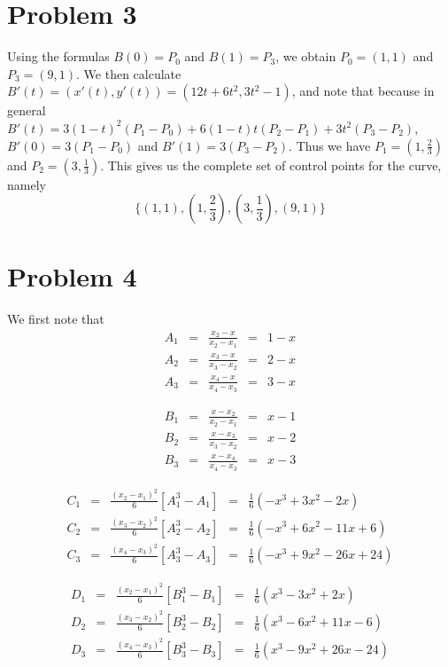 \documentclass[11pt]{article} %
\begin{document}
\section*{Problem 3}
Using the formulas $B(0) = P_0$ and $B(1) = P_3$, we obtain $P_0 = (1,1)$ and $P_3 = (9,1)$. We then calculate $B'(t) = (x'(t),y'(t)) = (12t+6t^2,3t^2 - 1)$, and note that because in general $B'(t) = 3(1-t)^2(P_1 - P_0) + 6(1-t)t(P_2-P_1) + 3t^2(P_3 - P_2)$, $B'(0) = 3(P_1 - P_0)$ and $B'(1) = 3(P_3 - P_2)$. Thus we have $P_1 = (1,\frac{2}{3})$ and $P_2 = (3,\frac{1}{3})$. This gives us the complete set of control points for the curve, namely
$$\{(1,1),  (1,\frac{2}{3}),   (3,\frac{1}{3}), (9,1) \}$$
\section*{Problem 4}

We first note that 
$$\begin{array}{lclcl} A_1 & = &  \frac{x_2 - x}{x_2 - x_1} & = & 1-x \\
		        A_2 & = & \frac{x_3 - x}{x_3 - x_2} & = & 2-x \\
		        A_3 & = & \frac{x_4 - x}{x_4 - x_3} & = & 3-x 
\end{array}$$

$$\begin{array}{lclcl} B_1 & = &  \frac{x - x_2}{x_2 - x_1} & = & x - 1 \\
		        B_2 & = & \frac{x -x_3}{x_3 - x_2} & = & x - 2 \\
		        B_3 & = & \frac{x - x_4}{x_4 - x_3} & = & x - 3 
\end{array}$$

$$\begin{array}{lclcl} C_1 & = &  \frac{(x_2 - x_1)^2}{6}[A_1^3 - A_1] & = & \frac{1}{6}(-x^3 + 3x^2 - 2x) \\
		        C_2 & =&  \frac{(x_3 - x_2)^2}{6}[A_2^3 - A_2] & = &\frac{1}{6}(-x^3 + 6x^2 - 11x + 6) \\
		        C_3 & =&  \frac{(x_4 - x_3)^2}{6}[A_3^3 - A_3] & = & \frac{1}{6}(-x^3 + 9x^2 - 26x + 24) 
\end{array}$$

$$\begin{array}{lclcl} D_1 & = &  \frac{(x_2 - x_1)^2}{6}[B_1^3 - B_1] & = & \frac{1}{6}(x^3 - 3x^2 + 2x) \\
		        D_2 & =&  \frac{(x_3 - x_2)^2}{6}[B_2^3 - B_2] & = &\frac{1}{6}(x^3 - 6x^2 + 11x - 6) \\
		        D_3 & =&  \frac{(x_4 - x_3)^2}{6}[B_3^3 - B_3] & = & \frac{1}{6}(x^3 - 9x^2 + 26x - 24) 
\end{array}$$
\end{document}

